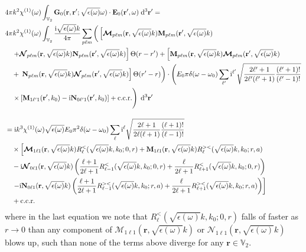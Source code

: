 \documentclass{article}
\begin{document}
\begin{equation}
\begin{split}
&4\pi k^2\chi^{(1)}(\omega)\int_{\mathbb{V}_2}\mathbf{G}_0(\mathbf{r},\mathbf{r}';\sqrt{\epsilon(\omega)}\omega)\cdot\mathbf{E}_0(\mathbf{r}',\omega)\;\mathrm{d}^3\mathbf{r}' = \\
&4\pi k^2\chi^{(1)}(\omega)\int_{\mathbb{V}_2}\frac{\mathrm{i}\sqrt{\epsilon(\omega)}k}{4\pi}\sum_{p\ell m}\left( \vphantom{\frac{1}{2}} \left[\bm{\mathcal{M}}_{p\ell m}(\mathbf{r},\sqrt{\epsilon(\omega)}k)\mathbf{M}_{p\ell m}(\mathbf{r}',\sqrt{\epsilon(\omega)}k)\right.\right.\\
&\left.\quad+ \bm{\mathcal{N}}_{p\ell m}(\mathbf{r},\sqrt{\epsilon(\omega)}k)\mathbf{N}_{p\ell m}(\mathbf{r}',\sqrt{\epsilon(\omega)}k)\right]\Theta(r - r') +\left[\mathbf{M}_{p\ell m}(\mathbf{r},\sqrt{\epsilon(\omega)}k)\bm{\mathcal{M}}_{p\ell m}(\mathbf{r}',\sqrt{\epsilon(\omega)}k)\right.\\
&\quad+\left.\left. \mathbf{N}_{p\ell m}(\mathbf{r},\sqrt{\epsilon(\omega)}k)\bm{\mathcal{N}}_{p\ell m}(\mathbf{r}',\sqrt{\epsilon(\omega)}k)\right]\Theta(r' - r) \vphantom{\frac{1}{2}} \right)\cdot\left(E_0\pi\delta(\omega - \omega_0)\sum_{\ell'}\mathrm{i}^{\ell'}\sqrt{\frac{2\ell'+1}{2\ell'(\ell'+1)}\frac{(\ell'+1)!}{(\ell'-1)!}}\right.\\
&\quad\left.\times\left[\mathbf{M}_{1\ell'1}(\mathbf{r}',k_0) - \mathrm{i}\mathbf{N}_{0\ell'1}(\mathbf{r}',k_0)\right] + \mathrm{c.c.r.} \vphantom{\sum_{\ell'}} \right)\;\mathrm{d}^3\mathbf{r}'\\[1.0em]
&= \mathrm{i}k^3\chi^{(1)}(\omega)\sqrt{\epsilon(\omega)}E_0\pi^2\delta(\omega - \omega_0)\sum_\ell\mathrm{i}^\ell\sqrt{\frac{2\ell + 1}{2\ell(\ell + 1)}\frac{(\ell + 1)!}{(\ell - 1)!}}\\
&\quad\times\left[\bm{\mathcal{M}}_{1\ell1}(\mathbf{r},\sqrt{\epsilon(\omega)}k)R_\ell^<(\sqrt{\epsilon(\omega)}k,k_0;0,r) + \mathbf{M}_{1\ell1}(\mathbf{r},\sqrt{\epsilon(\omega)}k)R_\ell^{><}(\sqrt{\epsilon(\omega)}k,k_0;r,a)\right.\\
&\quad-\mathrm{i}\bm{\mathcal{N}}_{0\ell1}(\mathbf{r},\sqrt{\epsilon(\omega)}k)\left(\frac{\ell + 1}{2\ell + 1}R_{\ell - 1}^<(\sqrt{\epsilon(\omega)}k,k_0;0,r) + \frac{\ell}{2\ell + 1}R_{\ell+1}^<(\sqrt{\epsilon(\omega)}k,k_0;0,r)\right)\\
&\left.\quad-\mathrm{i}\mathbf{N}_{0\ell1}(\mathbf{r},\sqrt{\epsilon(\omega)}k)\left(\frac{\ell + 1}{2\ell + 1}R_{\ell - 1}^{><}(\sqrt{\epsilon(\omega)}k,k_0;r,a) + \frac{\ell}{2\ell + 1}R_{\ell+1}^{><}(\sqrt{\epsilon(\omega)}k,k_0;r,a)\right)\right]\\
&\quad+\mathrm{c.c.r.}
\end{split}
\end{equation}
where in the last equation we note that $R_\ell^<(\sqrt{\epsilon(\omega)}k,k_0;0,r)$ falls of faster as $r\to0$ than any component of $\bm{\mathcal{M}}_{1\ell1}(\mathbf{r},\sqrt{\epsilon(\omega)}k)$ or $\bm{\mathcal{N}}_{1\ell1}(\mathbf{r},\sqrt{\epsilon(\omega)}k)$ blows up, such than none of the terms above diverge for any $\mathbf{r}\in\mathbb{V}_2$.
\end{document}
